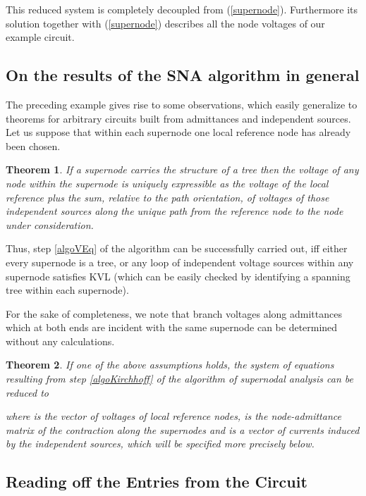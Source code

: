 \documentclass[10pt,journal,twocolumn,pagenumbers]{IEEEtran}
\newtheorem{theorem}{Theorem}
\begin{document}
This reduced system is completely decoupled from (\ref{supernode}). Furthermore its solution together with (\ref{supernode}) describes all the node voltages of our example circuit.



\subsection{On the results of the SNA algorithm in general}

The preceding example gives rise to some observations, which easily generalize to theorems for arbitrary circuits built from admittances and independent sources. Let us suppose that within each supernode one local reference node has already been chosen.

\smallskip
\begin{theorem}
If a supernode carries the structure of a tree then the voltage of any node within the supernode is uniquely expressible as the voltage of the local reference plus the sum, relative to the path orientation, of voltages of those independent sources along the unique path from the reference node to the node under consideration.
\end{theorem}

\smallskip
Thus, step \ref{algoVEq} of the algorithm can be successfully carried out, iff either every supernode is a tree, or any loop of independent voltage sources within any supernode satisfies KVL (which can be easily checked by identifying a spanning tree within each supernode). 

For the sake of completeness, we note that branch voltages along admittances which at both ends are incident with the same supernode can be determined without any calculations.

\smallskip
\begin{theorem}
If one of the above assumptions holds, the system of equations resulting from step \ref{algoKirchhoff} of the algorithm of supernodal analysis can be reduced to

where  is the vector of voltages of local reference nodes,  is the node-admittance matrix of the contraction along the supernodes  and  is a vector of currents induced by the independent sources, which will be specified more precisely below.
\end{theorem}
\subsection{Reading off the Entries from the Circuit}
\end{document}
